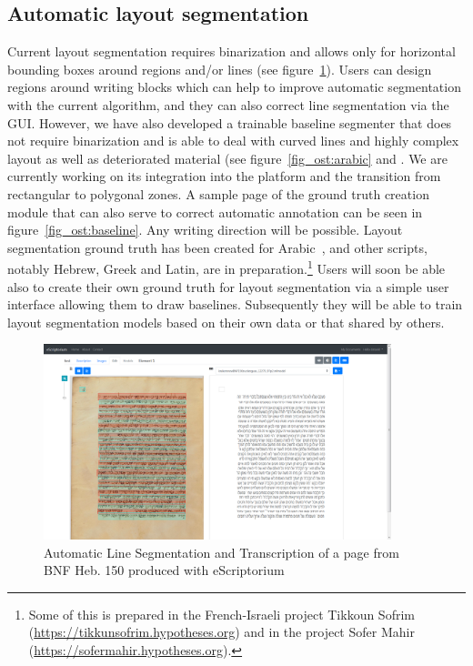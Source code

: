 \subsection{Automatic layout segmentation}

Current layout segmentation requires binarization and allows only for
horizontal bounding boxes around regions and/or lines (see figure~\ref{fig_ost:automatic}). Users can
design regions around writing blocks which can help to improve automatic
segmentation with the current algorithm, and they can also correct line
segmentation via the GUI. However, we have also developed a trainable baseline
segmenter that does not require binarization and is able to deal with curved
lines and highly complex layout as well as deteriorated material (see figure~\ref{fig_ost:arabic}
and \cite{kiessling2019badam}. We are currently working on its integration into
the platform and the transition from rectangular to polygonal zones. A sample
page of the ground truth creation module that can also serve to correct
automatic annotation can
be seen in figure~\ref{fig_ost:baseline}. Any writing direction will be possible. Layout segmentation
ground truth has been created for Arabic~\cite{kiessling2019badam}, and other scripts, notably
Hebrew, Greek and Latin, are in preparation.\footnote{Some of this is prepared
in the French-Israeli project Tikkoun Sofrim
(\url{https://tikkunsofrim.hypotheses.org})
\cite{kuflik2019tikkoun,wecker2019tikkoun} and in the project Sofer Mahir
(\url{https://sofermahir.hypotheses.org}).} Users will soon be able also to
create their own ground truth for layout segmentation via a simple user
interface allowing them to draw baselines. Subsequently they will be able to
train layout segmentation models based on their own data or that shared by
others.

\begin{figure}
	\centering
	\includegraphics[width=0.9\textwidth]{automatic_transcription_BNF_heb_150.png}
	\caption{Automatic Line Segmentation and Transcription of a page from BNF Heb. 150 produced with eScriptorium}
	\label{fig_ost:automatic}
\end{figure}

